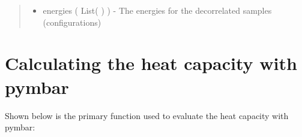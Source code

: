 \documentclass[letterpaper,12pt,english,openany,oneside]{sphinxmanual}
\begin{document}
\begin{fulllineitems}
\begin{quote}
\begin{description}
\begin{itemize}
\item {} 
energies ( List(  ) ) - The energies for the decorrelated samples (configurations)

\end{itemize}


\end{description}\end{quote}

\end{fulllineitems}


\newpage


\section{Calculating the heat capacity with pymbar}
\label{\detokenize{thermo:calculating-the-heat-capacity-with-pymbar}}
Shown below is the primary function used to evaluate the heat capacity with pymbar:

\label{\detokenize{thermo:module-thermo.calc}}
\end{document}

